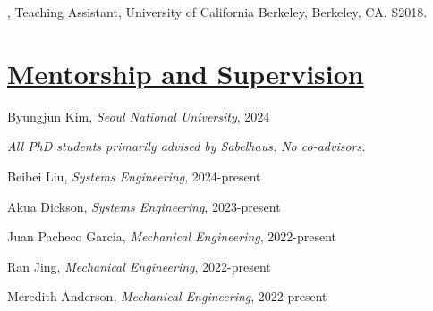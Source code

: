 \documentclass[letterpaper]{deedy-resume} %
\begin{document}
\vspace{0.1cm}

{}

\begin{etaremune}[itemsep=0.05cm]

\item {{}, Teaching Assistant, University of California Berkeley, Berkeley, CA. S2018.}

\end{etaremune}


\section{\underline{Mentorship and Supervision}}
\vspace{0.2cm}

{}

\begin{etaremune}[itemsep=0.05cm]

\item Byungjun Kim, {\it Seoul National University}, 2024

\end{etaremune}

{}

\vspace{0.2cm}

{\it All PhD students primarily advised by Sabelhaus. No co-advisors.}

\begin{etaremune}[itemsep=0.02cm]

\item Beibei Liu, {\it Systems Engineering}, 2024-present

\item Akua Dickson, {\it Systems Engineering}, 2023-present

\item Juan Pacheco Garcia, {\it Mechanical Engineering}, 2022-present

\item Ran Jing, {\it Mechanical Engineering}, 2022-present

\item Meredith Anderson, {\it Mechanical Engineering}, 2022-present

\end{etaremune}
\end{document}
